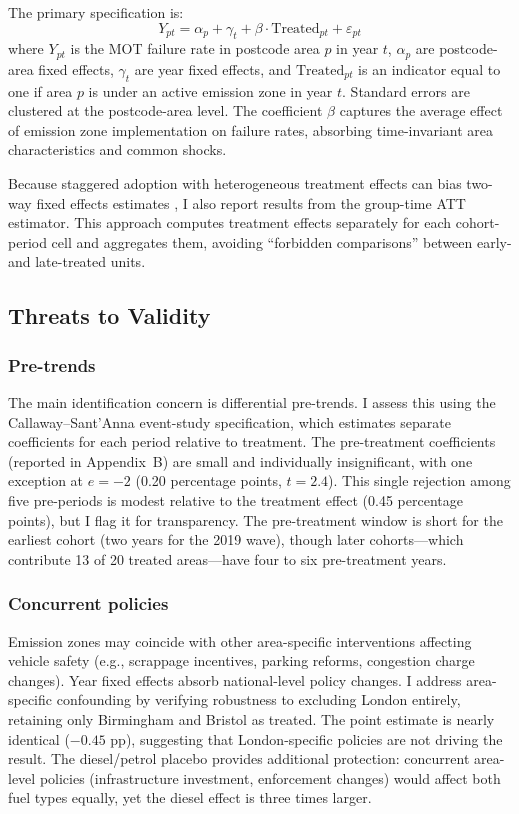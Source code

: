 \documentclass[12pt]{article}
\begin{document}
The primary specification is:
\begin{equation}
Y_{pt} = \alpha_p + \gamma_t + \beta \cdot \text{Treated}_{pt} + \varepsilon_{pt}
\label{eq:twfe}
\end{equation}
where $Y_{pt}$ is the MOT failure rate in postcode area $p$ in year $t$, $\alpha_p$ are postcode-area fixed effects, $\gamma_t$ are year fixed effects, and $\text{Treated}_{pt}$ is an indicator equal to one if area $p$ is under an active emission zone in year $t$. Standard errors are clustered at the postcode-area level. The coefficient $\beta$ captures the average effect of emission zone implementation on failure rates, absorbing time-invariant area characteristics and common shocks.

Because staggered adoption with heterogeneous treatment effects can bias two-way fixed effects estimates \citep{goodmanbacon2021}, I also report results from the \citet{callaway2021} group-time ATT estimator. This approach computes treatment effects separately for each cohort-period cell and aggregates them, avoiding ``forbidden comparisons'' between early- and late-treated units.

\subsection{Threats to Validity}

\subsubsection*{Pre-trends} The main identification concern is differential pre-trends. I assess this using the Callaway--Sant'Anna event-study specification, which estimates separate coefficients for each period relative to treatment. The pre-treatment coefficients (reported in Appendix~B) are small and individually insignificant, with one exception at $e = -2$ (0.20 percentage points, $t = 2.4$). This single rejection among five pre-periods is modest relative to the treatment effect (0.45 percentage points), but I flag it for transparency. The pre-treatment window is short for the earliest cohort (two years for the 2019 wave), though later cohorts---which contribute 13 of 20 treated areas---have four to six pre-treatment years.

\subsubsection*{Concurrent policies} Emission zones may coincide with other area-specific interventions affecting vehicle safety (e.g., scrappage incentives, parking reforms, congestion charge changes). Year fixed effects absorb national-level policy changes. I address area-specific confounding by verifying robustness to excluding London entirely, retaining only Birmingham and Bristol as treated. The point estimate is nearly identical ($-0.45$ pp), suggesting that London-specific policies are not driving the result. The diesel/petrol placebo provides additional protection: concurrent area-level policies (infrastructure investment, enforcement changes) would affect both fuel types equally, yet the diesel effect is three times larger.
\end{document}
